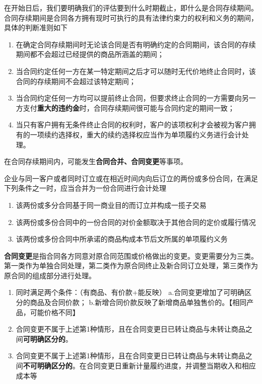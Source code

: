 \documentclass[UTF8,12pt]{ctexart}
\numberwithin{equation}{section} %
\numberwithin{figure}{section}
\numberwithin{table}{section}
\begin{document}
	在开始日后，我们要明确我们的评估要到什么时期截止，即什么是合同存续期间。合同存续期间是合同各方拥有现时可执行的具有法律约束力的权利和义务的期间，具体的判断准则如下
	\begin{enumerate}
		\item 在确定合同存续期间时无论该合同是否有明确约定的合同期间，该合同的存续期间都不会超过已经提供的商品所涵盖的期间；
		
		\item 当合同约定任何一方在某一特定期间之后才可以随时无代价地终止合同时，该合同的存续期间不会超过该特定期间；
		
		\item 当合同约定任何一方均可以提前终止合同，但要求终止合同的一方需要向另一方支付\textbf{重大的违约金}时，合同存续期间很可能与合同约定的期间一致；
		
		\item 当只有客户拥有无条件终止合同的权利时，客户的该项权利才会被视为客户拥有的一项续约选择权，重大的续约选择权应当作为单项履约义务进行会计处理。
	\end{enumerate}
	
	在合同存续期间内，可能发生\textbf{合同合并、合同变更}等事项。
	
	企业与同一客户或者同时订立或在相近时间内向后订立的两份或多份合同，在满足下列条件之一时，应当合并为一份合同进行会计处理
	\begin{enumerate}
		\item 该两份或多分合同基于同一商业目的而订立并构成一揽子交易
		
		\item 该两份或多份合同中的一份合同的对价金额取决于其他合同的定价或履行情况
		
		\item 该两份或多份合同中所承诺的商品构成本节后文所属的单项履约义务
	\end{enumerate}

	\textbf{合同变更}是指合同各方同意对原合同范围或价格做出的变更。变更需要分为三类。第一类作为单独合同处理，第二类作为原合同终止及新合同订立处理，第三类作为原合同的组成部分进行处理。
	\begin{enumerate}
		\item 同时满足两个条件：（有商品、有价款+能反映）
		a.合同变更增加了可明确区分的商品及合同价款；
		b.新增合同价款反映了新增商品单独售价的。【相同产品，可能价格不同】
		
		\item 合同变更不属于上述第1种情形，且在合同变更日已转让商品与未转让商品之间\textbf{可明确区分的}。
		
		\item 合同变更不属于上述第1种情形，且在合同变更日已转让商品与未转让商品之间\textbf{不可明确区分的}。在合同变更日重新计量履约进度，并调整当期收入和相应成本等
	\end{enumerate}
	
\end{document}
